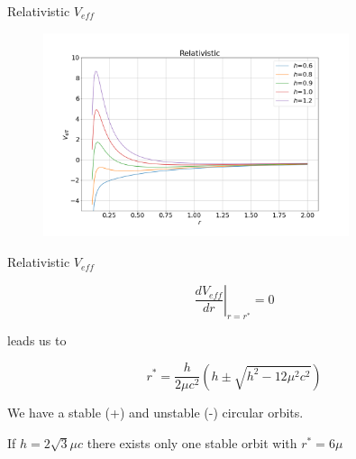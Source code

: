 \documentclass[xcolor=dvipsnames]{beamer}
\begin{document}
\begin{frame}{Relativistic $V_{eff}$}
    
    \begin{figure}[h!]
        \centering
        \includegraphics[width=0.8\textwidth]{Presentations/Images/2_veff_relat.png}
    \end{figure}
    
\end{frame}


\begin{frame}{Relativistic $V_{eff}$}
    
\begin{equation*}
    \left. \frac{dV_{eff}}{dr}\right|_{r=r^*} = 0 
\end{equation*}

leads us to 

\begin{block}{}

\begin{equation*}
    r^* = \frac{h}{2\mu c^2} \left( h \pm \sqrt{h^2 - 12 \mu^2 c^2} \right)
\end{equation*}

\end{block}

We have a stable (+) and unstable (-) circular orbits. 

If $h = 2\sqrt{3} \mu c$ there exists only one stable orbit with $r^* = 6 \mu$

\end{frame}
\end{document}
